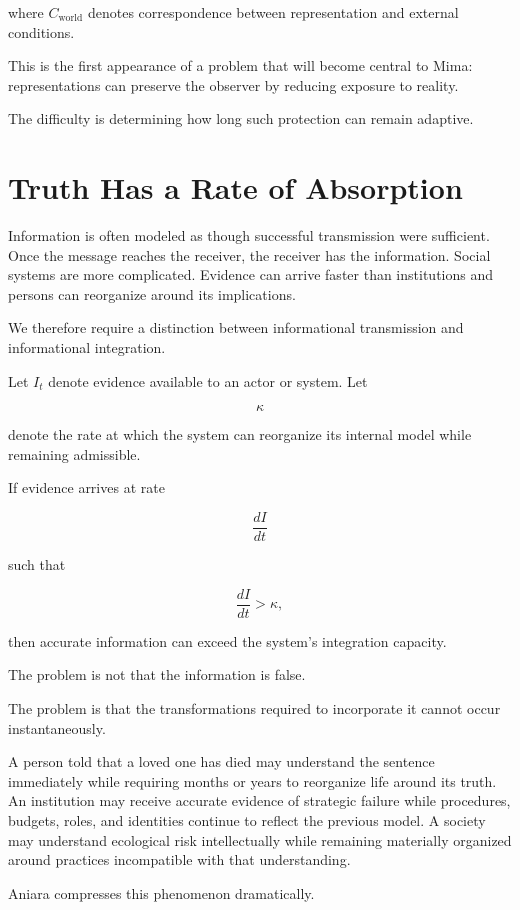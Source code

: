 \documentclass[11pt,oneside]{book}
\theoremstyle{definition}
\theoremstyle{remark}
\begin{document}
where \(C_{\mathrm{world}}\) denotes correspondence between representation and external conditions.

This is the first appearance of a problem that will become central to Mima: representations can preserve the observer by reducing exposure to reality.

The difficulty is determining how long such protection can remain adaptive.

\section{Truth Has a Rate of Absorption}

Information is often modeled as though successful transmission were sufficient. Once the message reaches the receiver, the receiver has the information. Social systems are more complicated. Evidence can arrive faster than institutions and persons can reorganize around its implications.

We therefore require a distinction between informational transmission and informational integration.

Let \(I_t\) denote evidence available to an actor or system. Let

\[
\kappa
\]

denote the rate at which the system can reorganize its internal model while remaining admissible.

If evidence arrives at rate

\[
\frac{dI}{dt}
\]

such that

\[
\frac{dI}{dt}>\kappa,
\]

then accurate information can exceed the system's integration capacity.

The problem is not that the information is false.

The problem is that the transformations required to incorporate it cannot occur instantaneously.

A person told that a loved one has died may understand the sentence immediately while requiring months or years to reorganize life around its truth. An institution may receive accurate evidence of strategic failure while procedures, budgets, roles, and identities continue to reflect the previous model. A society may understand ecological risk intellectually while remaining materially organized around practices incompatible with that understanding.

Aniara compresses this phenomenon dramatically.
\end{document}
